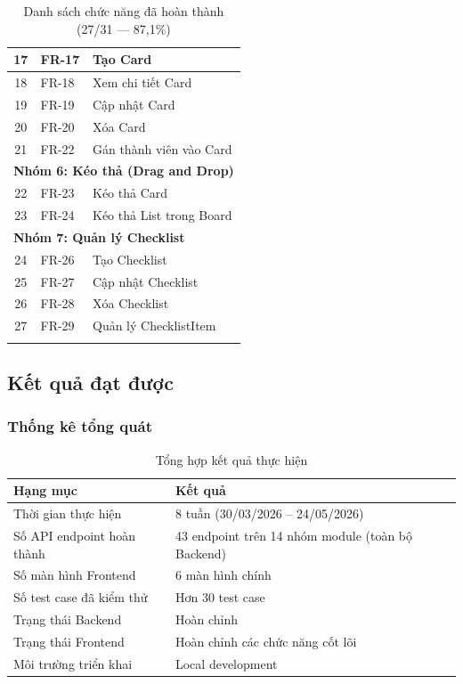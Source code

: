 \begin{longtable}{|c|p{2.5cm}|p{9cm}|}
\hline
17 & FR-17 & Tạo Card \\
\hline
18 & FR-18 & Xem chi tiết Card \\
\hline
19 & FR-19 & Cập nhật Card \\
\hline
20 & FR-20 & Xóa Card \\
\hline
21 & FR-22 & Gán thành viên vào Card \\
\hline
\multicolumn{3}{|l|}{\cellcolor{gray!20}\textbf{Nhóm 6: Kéo thả (Drag and Drop)}} \\
\hline
22 & FR-23 & Kéo thả Card \\
\hline
23 & FR-24 & Kéo thả List trong Board \\
\hline
\multicolumn{3}{|l|}{\cellcolor{gray!20}\textbf{Nhóm 7: Quản lý Checklist}} \\
\hline
24 & FR-26 & Tạo Checklist \\
\hline
25 & FR-27 & Cập nhật Checklist \\
\hline
26 & FR-28 & Xóa Checklist \\
\hline
27 & FR-29 & Quản lý ChecklistItem \\
\hline
\caption{Danh sách chức năng đã hoàn thành (27/31 — 87,1\%)}
\label{tab:done_all}
\end{longtable}

\subsection{Kết quả đạt được}

\subsubsection{Thống kê tổng quát}

\begin{table}[H]
\centering
\begin{tabular}{|p{6cm}|p{8cm}|}
\hline
\textbf{Hạng mục} & \textbf{Kết quả} \\
\hline
Thời gian thực hiện & 8 tuần (30/03/2026 – 24/05/2026) \\
\hline
Số API endpoint hoàn thành & 43 endpoint trên 14 nhóm module (toàn bộ Backend) \\
\hline
Số màn hình Frontend & 6 màn hình chính \\
\hline
Số test case đã kiểm thử & Hơn 30 test case \\
\hline
Trạng thái Backend & Hoàn chỉnh \\
\hline
Trạng thái Frontend & Hoàn chỉnh các chức năng cốt lõi \\
\hline
Môi trường triển khai & Local development \\
\hline
\end{tabular}
\caption{Tổng hợp kết quả thực hiện}
\label{tab:results_summary}
\end{table}

